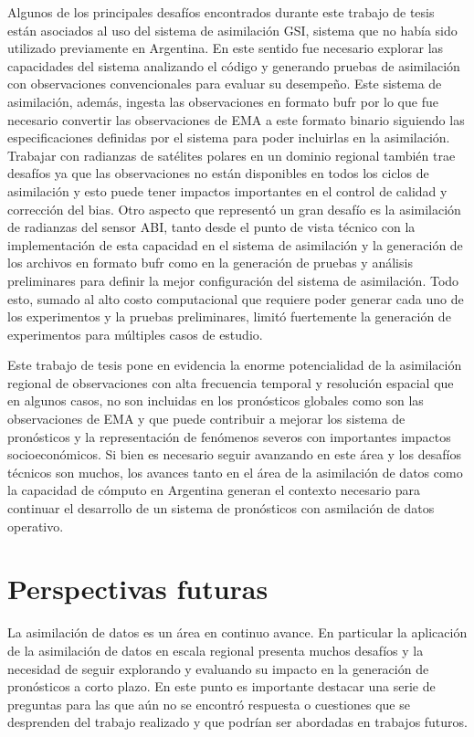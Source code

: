 \documentclass[12pt,oneside,a4paper]{reedthesis}
\begin{document}
Algunos de los principales desafíos encontrados durante este trabajo de tesis están asociados al uso del sistema de asimilación GSI, sistema que no había sido utilizado previamente en Argentina. En este sentido fue necesario explorar las capacidades del sistema analizando el código y generando pruebas de asimilación con observaciones convencionales para evaluar su desempeño. Este sistema de asimilación, además, ingesta las observaciones en formato bufr por lo que fue necesario convertir las observaciones de EMA a este formato binario siguiendo las especificaciones definidas por el sistema para poder incluirlas en la asimilación. Trabajar con radianzas de satélites polares en un dominio regional también trae desafíos ya que las observaciones no están disponibles en todos los ciclos de asimilación y esto puede tener impactos importantes en el control de calidad y corrección del bias. Otro aspecto que representó un gran desafío es la asimilación de radianzas del sensor ABI, tanto desde el punto de vista técnico con la implementación de esta capacidad en el sistema de asimilación y la generación de los archivos en formato bufr como en la generación de pruebas y análisis preliminares para definir la mejor configuración del sistema de asimilación. Todo esto, sumado al alto costo computacional que requiere poder generar cada uno de los experimentos y la pruebas preliminares, limitó fuertemente la generación de experimentos para múltiples casos de estudio.

Este trabajo de tesis pone en evidencia la enorme potencialidad de la asimilación regional de observaciones con alta frecuencia temporal y resolución espacial que en algunos casos, no son incluidas en los pronósticos globales como son las observaciones de EMA y que puede contribuir a mejorar los sistema de pronósticos y la representación de fenómenos severos con importantes impactos socioeconómicos. Si bien es necesario seguir avanzando en este área y los desafíos técnicos son muchos, los avances tanto en el área de la asimilación de datos como la capacidad de cómputo en Argentina generan el contexto necesario para continuar el desarrollo de un sistema de pronósticos con asmilación de datos operativo.

\hypertarget{perspectivas-futuras}{%
\section{Perspectivas futuras}\label{perspectivas-futuras}}

La asimilación de datos es un área en continuo avance. En particular la aplicación de la asimilación de datos en escala regional presenta muchos desafíos y la necesidad de seguir explorando y evaluando su impacto en la generación de pronósticos a corto plazo. En este punto es importante destacar una serie de preguntas para las que aún no se encontró respuesta o cuestiones que se desprenden del trabajo realizado y que podrían ser abordadas en trabajos futuros.
\end{document}
